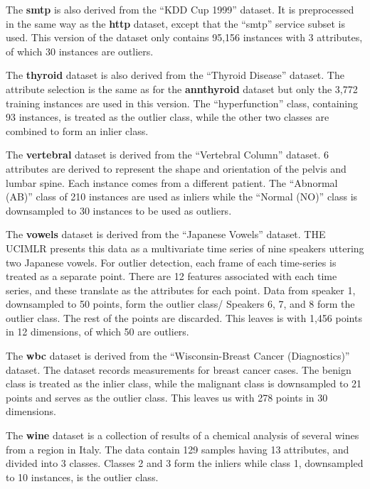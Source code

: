 \documentclass{article}
\begin{document}
The \textbf{smtp} is also derived from the ``KDD Cup 1999'' dataset.
It is preprocessed in the same way as the \textbf{http} dataset, except that the ``smtp'' service subset is used.
This version of the dataset only contains 95,156 instances with 3 attributes, of which 30 instances are outliers.

The \textbf{thyroid} dataset is also derived from the ``Thyroid Disease'' dataset.
The attribute selection is the same as for the \textbf{annthyroid} dataset but only the 3,772 training instances are used in this version.
The ``hyperfunction'' class, containing 93 instances, is treated as the outlier class, while the other two classes are combined to form an inlier class.

The \textbf{vertebral} dataset is derived from the ``Vertebral Column'' dataset.
6 attributes are derived to represent the shape and orientation of the pelvis and lumbar spine.
Each instance comes from a different patient.
The ``Abnormal (AB)'' class of 210 instances are used as inliers while the ``Normal (NO)'' class is downsampled to 30 instances to be used as outliers.

The \textbf{vowels} dataset is derived from the ``Japanese Vowels'' dataset.
THE UCIMLR presents this data as a multivariate time series of nine speakers uttering two Japanese vowels.
For outlier detection, each frame of each time-series is treated as a separate point.
There are 12 features associated with each time series, and these translate as the attributes for each point.
Data from speaker 1, downsampled to 50 points, form the outlier class/
Speakers 6, 7, and 8 form the outlier class.
The rest of the points are discarded.
This leaves is with 1,456 points in 12 dimensions, of which 50 are outliers.

The \textbf{wbc} dataset is derived from the ``Wisconsin-Breast Cancer (Diagnostics)'' dataset.
The dataset records measurements for breast cancer cases.
The benign class is treated as the inlier class, while the malignant class is downsampled to 21 points and serves as the outlier class.
This leaves us with 278 points in 30 dimensions.

The \textbf{wine} dataset is a collection of results of a chemical analysis of several wines from a region in Italy.
The data contain 129 samples having 13 attributes, and divided into 3 classes.
Classes 2 and 3 form the inliers while class 1, downsampled to 10 instances, is the outlier class.
\end{document}
